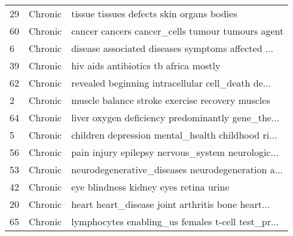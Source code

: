 \begin{tabular}{lll}
29                                                 &                                            Chronic &          tissue tissues defects skin organs bodies \\
60                                                 &                                            Chronic &   cancer cancers cancer\_cells tumour tumours agent \\
6                                                  &                                            Chronic &  disease associated diseases symptoms affected ... \\
39                                                 &                                            Chronic &              hiv aids antibiotics tb africa mostly \\
62                                                 &                                            Chronic &  revealed beginning intracellular cell\_death de... \\
2                                                  &                                            Chronic &    muscle balance stroke exercise recovery muscles \\
64                                                 &                                            Chronic &  liver oxygen deficiency predominantly gene\_the... \\
5                                                  &                                            Chronic &  children depression mental\_health childhood ri... \\
56                                                 &                                            Chronic &  pain injury epilepsy nervous\_system neurologic... \\
53                                                 &                                            Chronic &  neurodegenerative\_diseases neurodegeneration a... \\
42                                                 &                                            Chronic &             eye blindness kidney eyes retina urine \\
20                                                 &                                            Chronic &  heart heart\_disease joint arthritis bone heart... \\
65                                                 &                                            Chronic &  lymphocytes enabling\_us females t-cell test\_pr... \\

\end{tabular}
